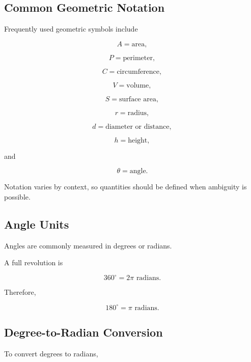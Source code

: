 \subsection{Common Geometric Notation}
\label{subsec:common-geometric-notation}

Frequently used geometric symbols include

\[
\boxed{
A
=
\text{area},
}
\]

\[
\boxed{
P
=
\text{perimeter},
}
\]

\[
\boxed{
C
=
\text{circumference},
}
\]

\[
\boxed{
V
=
\text{volume},
}
\]

\[
\boxed{
S
=
\text{surface area},
}
\]

\[
\boxed{
r
=
\text{radius},
}
\]

\[
\boxed{
d
=
\text{diameter or distance},
}
\]

\[
\boxed{
h
=
\text{height},
}
\]

and

\[
\boxed{
\theta
=
\text{angle}.
}
\]

Notation varies by context, so quantities should be defined when ambiguity is
possible.

\subsection{Angle Units}
\label{subsec:angle-units-reference}

Angles are commonly measured in degrees or radians.

A full revolution is

\[
\boxed{
360^\circ
=
2\pi
\text{ radians}.
}
\]

Therefore,

\[
\boxed{
180^\circ
=
\pi
\text{ radians}.
}
\]

\subsection{Degree-to-Radian Conversion}
\label{subsec:degree-radian-conversion}

To convert degrees to radians,

